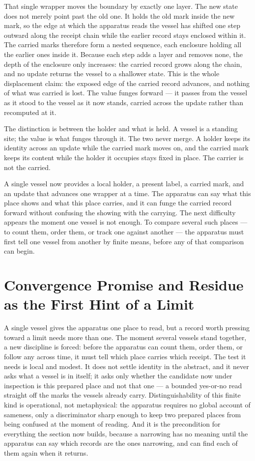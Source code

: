 That single wrapper moves the boundary by exactly one layer. The new state does not merely point past the old one. It holds the old mark inside the new mark, so the edge at which the apparatus reads the vessel has shifted one step outward along the receipt chain while the earlier record stays enclosed within it. The carried marks therefore form a nested sequence, each enclosure holding all the earlier ones inside it. Because each step adds a layer and removes none, the depth of the enclosure only increases: the carried record grows along the chain, and no update returns the vessel to a shallower state. This is the whole displacement claim: the exposed edge of the carried record advances, and nothing of what was carried is lost. The value funges forward --- it passes from the vessel as it stood to the vessel as it now stands, carried across the update rather than recomputed at it.

The distinction is between the holder and what is held. A vessel is a standing site; the value is what funges through it. The two never merge. A holder keeps its identity across an update while the carried mark moves on, and the carried mark keeps its content while the holder it occupies stays fixed in place. The carrier is not the carried.

A single vessel now provides a local holder, a present label, a carried mark, and an update that advances one wrapper at a time. The apparatus can say what this place shows and what this place carries, and it can funge the carried record forward without confusing the showing with the carrying. The next difficulty appears the moment one vessel is not enough. To compare several such places --- to count them, order them, or track one against another --- the apparatus must first tell one vessel from another by finite means, before any of that comparison can begin.


\section[Convergence Promise]{Convergence Promise and Residue as the First Hint of a Limit}

A single vessel gives the apparatus one place to read, but a record worth pressing toward a limit needs more than one. The moment several vessels stand together, a new discipline is forced: before the apparatus can count them, order them, or follow any across time, it must tell which place carries which receipt. The test it needs is local and modest. It does not settle identity in the abstract, and it never asks what a vessel is in itself; it asks only whether the candidate now under inspection is this prepared place and not that one --- a bounded yes-or-no read straight off the marks the vessels already carry. Distinguishability of this finite kind is operational, not metaphysical: the apparatus requires no global account of sameness, only a discriminator sharp enough to keep two prepared places from being confused at the moment of reading. And it is the precondition for everything the section now builds, because a narrowing has no meaning until the apparatus can say which records are the ones narrowing, and can find each of them again when it returns.

